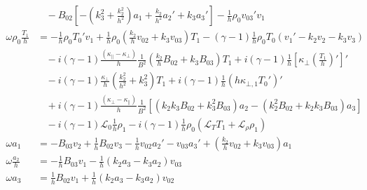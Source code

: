\documentclass[11pt, fleqn]{article}
\newcommand{\HL}{\mathscr{L}}
\begin{document}
\begin{equation}
\begin{aligned}
																&~~~~ - B_{02}\left[-\left(k_3^2 + \frac{k_2^2}{h^2}\right)a_1 + \frac{k_2}{h^2}a_2' + k_3a_3'\right] - \frac{1}{h}\rho_0v_{03}'v_1																																									\\[8pt]
		\omega \rho_0 \frac{T_1}{h}	&= -\frac{1}{h}\rho_0T_0'v_1 + \frac{1}{h}\rho_0\left(\frac{k_2}{h}v_{02} + k_3v_{03}\right)T_1 - (\gamma - 1)\frac{1}{h}\rho_0T_0\left(v_1' - k_2v_2 - k_3v_3\right)																							  \\
																&~~~~ - i(\gamma - 1)\frac{(\kappa_\parallel - \kappa_\bot)}{h}\frac{1}{B^2}\left(\frac{k_2}{h}B_{02} + k_3B_{03}\right)T_1 + i(\gamma - 1)\frac{1}{h}\left[\kappa_\bot\left(\frac{T_1}{h}\right)'\right]'					\\
																&~~~~ - i(\gamma - 1)\frac{\kappa_\bot}{h}\left(\frac{k_2^2}{h^2} + k_3^2\right)T_1 + i(\gamma - 1)\frac{1}{h}\left(h\kappa_{\bot, 1}T_0'\right)'																																		\\
																&~~~~ + i(\gamma - 1)\frac{(\kappa_\bot - \kappa_\parallel)}{h}\frac{1}{B^2}\left[\left(k_2k_3B_{02} + k_3^2B_{03}\right)a_2 - \left(k_2^2B_{02} + k_2k_3B_{03}\right)a_3\right]																		\\
																&~~~~ - i(\gamma - 1)\HL_0\frac{1}{h}\rho_1 - i(\gamma - 1)\frac{1}{h}\rho_0\left(\HL_T T_1 + \HL_\rho \rho_1\right)																																																\\[8pt]
		\omega a_1									&= -B_{03}v_2 + \frac{1}{h}B_{02}v_3 - \frac{1}{h}v_{02}a_2' - v_{03}a_3' + \left(\frac{k_2}{h}v_{02} + k_3v_{03}\right)a_1																																													\\[8pt]
		\omega \frac{a_2}{h}				&= -\frac{1}{h}B_{03}v_1 - \frac{1}{h}\left(k_2a_3 - k_3a_2\right)v_{03}																																																																						\\[8pt]
		\omega a_3									&= \frac{1}{h}B_{02}v_1 + \frac{1}{h}\left(k_2a_3 - k_3a_2\right)v_{02}																				
	\end{aligned}
\end{equation}

\newpage
\end{document}
